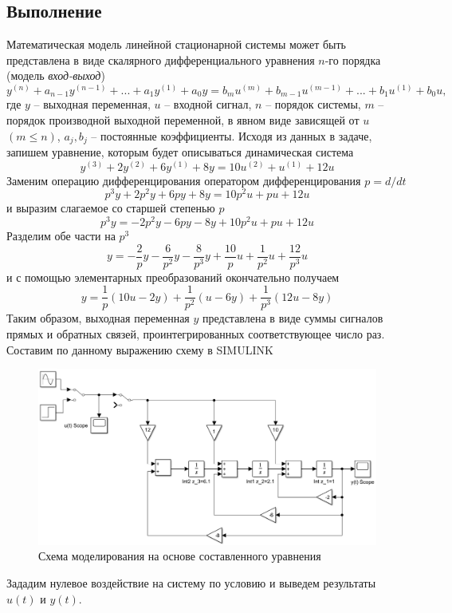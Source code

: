 \documentclass[a4paper, 12pt]{article}
\begin{document}
    \subsection{Выполнение}
    Математическая модель линейной стационарной системы может быть представлена в виде скалярного
    дифференциального уравнения $n$-го порядка (модель \textit{вход-выход})
    $$y^{(n)}+a_{n-1}y^{(n-1)}+...+a_1y^{(1)}+a_0y=b_mu^{(m)}+b_{m-1}u^{(m-1)}+...+b_1u^{(1)}+b_0u,$$
    где $y$ -- выходная переменная, $u$ -- входной сигнал, $n$ -- порядок системы, $m$ -- порядок производной
    выходной переменной, в явном виде зависящей от $u$ $(m\leq n)$, $a_j,b_j$ -- постоянные коэффициенты.
    Исходя из данных в задаче, запишем уравнение, которым будет описываться динамическая система
    $$y^{(3)}+2y^{(2)}+6y^{(1)}+8y=10u^{(2)}+u^{(1)}+12u$$
    Заменим операцию дифференцирования оператором дифференцирования $p=d/dt$
    $$p^3y+2p^2y+6py+8y=10p^2u+pu+12u$$
    и выразим слагаемое со старшей степенью $p$
    $$p^3y=-2p^2y-6py-8y+10p^2u+pu+12u$$
    Разделим обе части на $p^3$
    $$y=-\dfrac{2}{p}y-\dfrac{6}{p^2}y-\dfrac{8}{p^3}y+\dfrac{10}{p}u+\dfrac{1}{p^2}u+\dfrac{12}{p^3}u$$
    и с помощью элементарных преобразований окончательно получаем
    $$y=\dfrac{1}{p}\left(10u-2y\right)+\dfrac{1}{p^2}\left(u-6y\right)+\dfrac{1}{p^3}\left(12u-8y\right)$$
    Таким образом, выходная переменная $y$ представлена в виде суммы сигналов прямых и обратных связей,
    проинтегрированных соответствующее число раз. Составим по данному выражению схему в SIMULINK
    \begin{figure}[H]
        \centering
        \includegraphics[scale=0.5]{scheme1.png}
        \captionsetup{skip=0pt}
        \caption{Схема моделирования на основе составленного уравнения}
        \label{fig:scheme1}
    \end{figure}
    Зададим нулевое воздействие на систему по условию и выведем результаты $u(t)$ и $y(t)$.
\end{document}
